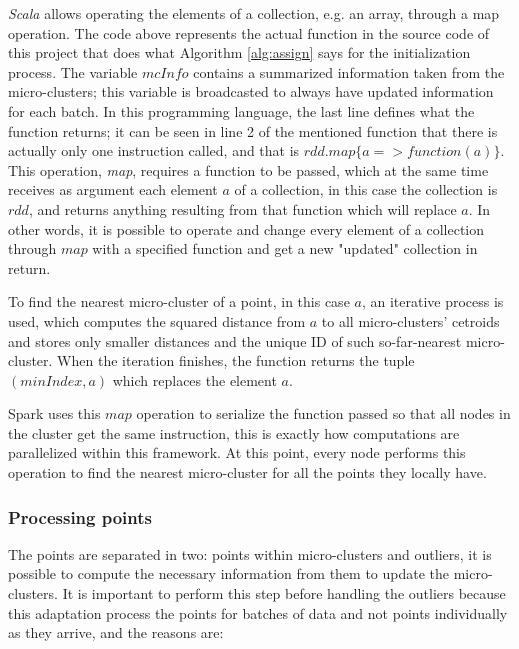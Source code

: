 \documentclass[10pt, conference, compsocconf]{IEEEtran}
\begin{document}
\textit{Scala} allows operating the elements of a collection, e.g. an array, through a map operation. The code above represents the actual function in the source code of this project that does what Algorithm \ref{alg:assign} says for the initialization process. The variable $mcInfo$ contains a summarized information taken from the micro-clusters; this variable is broadcasted to always have updated information for each batch. In this programming language, the last line defines what the function returns; it can be seen in line 2 of the mentioned function that there is actually only one instruction called, and that is $rdd.map\{a => function(a) \}$. This operation, \textit{map}, requires a function to be passed, which at the same time receives as argument each element $a$ of a collection, in this case the collection is $rdd$, and returns anything resulting from that function which will replace $a$. In other words, it is possible to operate and change every element of a collection through $map$ with a specified function and get a new "updated" collection in return.

To find the nearest micro-cluster of a point, in this case $a$, an iterative process is used, which computes the squared distance from $a$ to all micro-clusters' cetroids and stores only smaller distances and the unique ID of such so-far-nearest micro-cluster. When the iteration finishes, the function returns the tuple $(minIndex,a)$ which replaces the element $a$.

Spark uses this $map$ operation to serialize the function passed so that all nodes in the cluster get the same instruction, this is exactly how computations are parallelized  within this framework. At this point, every node performs this operation to find the nearest micro-cluster for all the points they locally have.



\subsubsection{Processing points}\label{procpoints}

The points are separated in two: points within micro-clusters and outliers, it is possible to compute the necessary information from them to update the micro-clusters. It is important to perform this step before handling the outliers because this adaptation process the points for batches of data and not points individually as they arrive, and the reasons are:
\end{document}
